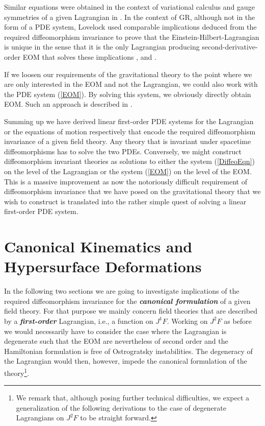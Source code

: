 Similar equations were obtained in the context of variational calculus and gauge symmetries of a given Lagrangian in \cite{article}. In the context of GR, although not in the form of a PDE system, Lovelock used comparable implications deduced from the required diffeomorphism invariance to prove that the Einstein-Hilbert-Lagrangian is unique in the sense that it is the only Lagrangian producing second-derivative-order EOM that solves these implications \cite{Lovelock1969}, \cite{doi:10.1063/1.1666069} and \cite{doi:10.1063/1.1665613}. 

If we loosen our requirements of the gravitational theory to the point where we are only interested in the EOM and not the Lagrangian, we could also work with the PDE system (\ref{EOM}). By solving this system, we obviously directly obtain EOM. Such an approach is described in \cite{TobiR}.

Summing up we have derived linear first-order PDE systems for the Lagrangian or the equations of motion respectively that encode the required diffeomorphism invariance of a given field theory. Any theory that is invariant under spacetime diffeomorphisms has to solve the two PDEs. Conversely, we might construct diffeomorphism invariant theories as solutions to either the system (\ref{DiffeoEqn}) on the level of the Lagrangian or the system (\ref{EOM}) on the level of the EOM. This is a massive improvement as now the notoriously difficult requirement of diffeomorphism invariance that we have posed on the gravitational theory that we wish to construct is translated into the rather simple quest of solving a linear first-order PDE system.  



\section{Canonical Kinematics and Hypersurface Deformations}
In the following two sections we are going to investigate implications of the required diffeomorphism invariance for the \textit{\textbf{canonical formulation}} of a given field theory. For that purpose we mainly concern field theories that are described by a \textit{\textbf{first-order}} Lagrangian, i.e., a function on $J^1F$. Working on $J^2F$ as before we would necessarily have to consider the case where the Lagrangian is degenerate such that the EOM are nevertheless of second order and the Hamiltonian formulation is free of Ostrogratsky instabilities. The degeneracy of the Lagrangian would then, however, impede the canonical formulation of the theory\footnote{We remark that, although posing further technical difficulties, we expect a generalization of the following derivations to the case of degenerate Lagrangians on $J^2F$ to be straight forward.}.

